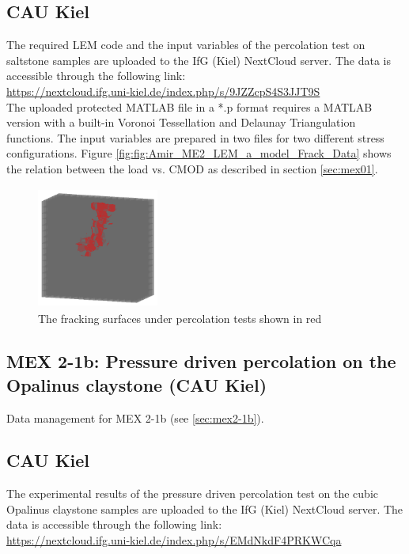 \subsection*{CAU Kiel}

The required LEM code and the input variables of the percolation test on saltstone samples are uploaded to the IfG (Kiel) NextCloud server. The data is accessible through the following link:\\
\hyperlink{https://nextcloud.ifg.uni-kiel.de/index.php/s/9JZZcpS4S3JJT9S}{https://nextcloud.ifg.uni-kiel.de/index.php/s/9JZZcpS4S3JJT9S}\\

The uploaded protected MATLAB file in a *.p format requires a MATLAB version with a built-in Voronoi Tessellation and Delaunay Triangulation functions. The input variables are prepared in two files for two different stress configurations. Figure \ref{fig:fig:Amir_ME2_LEM_a_model_Frack_Data} shows the relation between the load vs. CMOD as described in section \ref {sec:mex01}.

\begin{figure}[!ht]
\centering
\includegraphics[width=4cm,height=4cm]{figures/Amir_ME2_LEM_a_model_Frack_Data.png}
\caption{The fracking surfaces under percolation tests shown in red}
\label{fig:Amir_ME2_LEM_a_model_Frack_Data}
\end{figure}


\subsection{MEX 2-1b: Pressure driven percolation on the Opalinus claystone (CAU Kiel)}

Data management for MEX 2-1b (see \ref{sec:mex2-1b}).

\subsection*{CAU Kiel}

The experimental results of the pressure driven percolation test on the cubic Opalinus claystone samples are uploaded to the IfG (Kiel) NextCloud server. The data is accessible through the following link:\\
\hyperlink{https://nextcloud.ifg.uni-kiel.de/index.php/s/EMdNkdF4PRKWCqa}{https://nextcloud.ifg.uni-kiel.de/index.php/s/EMdNkdF4PRKWCqa}\\

